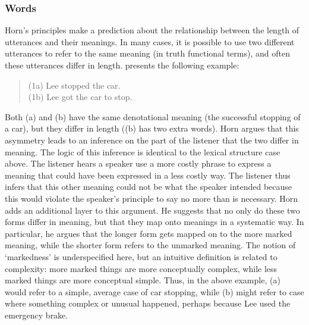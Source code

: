 \documentclass[man, noapacite, 12pt]{apa2}
\begin{document}
\subsubsection{Words}
Horn's principles make a prediction about the relationship between the length of utterances and their meanings. In many cases, it is possible to use two different utterances to refer to the same meaning (in truth functional terms), and often these utterances differ in length.  presents the following example: 
\begin{quote} 
 	(1a) Lee stopped the car.\\
	(1b) Lee got the car to stop.
	
\end{quote}
Both (a) and (b) have the same denotational meaning (the successful stopping of a car), but they differ in length ((b) has two extra words). Horn argues that this asymmetry leads to an inference on the part of the listener that the two differ in meaning. The logic of this inference is  identical to the lexical structure case above. The listener hears a speaker use a more costly phrase to express a meaning that could have been expressed in a less costly way. The listener thus infers that this other meaning could not be what the speaker intended because this would violate the speaker's principle to say no more than is necessary. Horn adds an additional layer to this argument. He suggests that no only do these two forms differ in meaning, but that they map onto meanings in a systematic way. In particular, he argues that the longer form gets mapped on to the more marked meaning, while the shorter form refers to the unmarked meaning.  The notion of `markedness' is underspecified here, but an intuitive definition is related to complexity: more marked things are more conceptually complex, while less marked things are more conceptual simple.  Thus, in the above example, (a) would refer to a simple, average case of car stopping, while (b) might refer to case where something complex or unusual happened, perhaps because Lee used the emergency brake.
\end{document}
